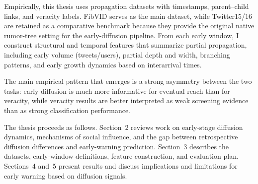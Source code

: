 Empirically, this thesis uses propagation datasets with timestamps, parent--child links, and veracity labels. FibVID serves as the main dataset, while Twitter15/16 are retained as a comparative benchmark because they provide the original native rumor-tree setting for the early-diffusion pipeline. From each early window, I construct structural and temporal features that summarize partial propagation, including early volume (tweets/users), partial depth and width, branching patterns, and early growth dynamics based on interarrival times.

The main empirical pattern that emerges is a strong asymmetry between the two tasks: early diffusion is much more informative for eventual reach than for veracity, while veracity results are better interpreted as weak screening evidence than as strong classification performance.

The thesis proceeds as follows. Section~2 reviews work on early-stage diffusion dynamics, mechanisms of social influence, and the gap between retrospective diffusion differences and early-warning prediction. Section~3 describes the datasets, early-window definitions, feature construction, and evaluation plan. Sections~4 and~5 present results and discuss implications and limitations for early warning based on diffusion signals.
